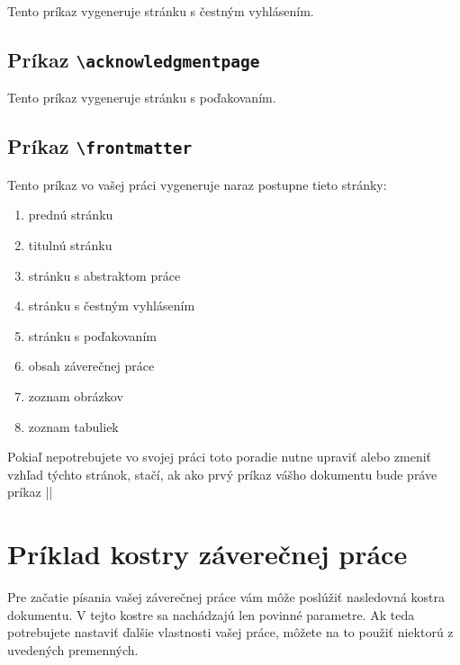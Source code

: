 Tento príkaz vygeneruje stránku s čestným vyhlásením.


\subsection{Príkaz {\tt \textbackslash{}acknowledgmentpage}}

Tento príkaz vygeneruje stránku s poďakovaním.


\subsection{Príkaz {\tt \textbackslash{}frontmatter}}

Tento príkaz vo vašej práci vygeneruje naraz postupne tieto stránky:

\begin{enumerate}
    \item prednú stránku
    \item titulnú stránku
    \item stránku s abstraktom práce
    \item stránku s čestným vyhlásením
    \item stránku s poďakovaním
    \item obsah záverečnej práce
    \item zoznam obrázkov
    \item zoznam tabuliek
\end{enumerate}

Pokiaľ nepotrebujete vo svojej práci toto poradie nutne upraviť alebo zmeniť vzhľad týchto stránok, stačí, ak ako prvý príkaz vášho dokumentu bude práve príkaz |\frontmatter|


\section{Príklad kostry záverečnej práce}

Pre začatie písania vašej záverečnej práce vám môže poslúžiť nasledovná kostra dokumentu. V tejto kostre sa nachádzajú len povinné parametre. Ak teda potrebujete nastaviť ďalšie vlastnosti vašej práce, môžete na to použiť niektorú z uvedených premenných.


